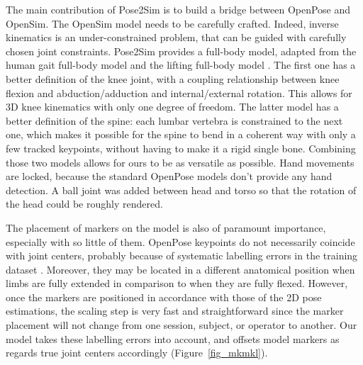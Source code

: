 The main contribution of Pose2Sim is to build a bridge between OpenPose and OpenSim. The OpenSim model needs to be carefully crafted. Indeed, inverse kinematics is an under-constrained problem, that can be guided with carefully chosen joint constraints. Pose2Sim provides a full-body model, adapted from the human gait full-body model \cite{Rajagopal2016} and the lifting full-body model \cite{Beaucage-Gauvreau2019}. The first one has a better definition of the knee joint, with a coupling relationship between knee flexion and abduction/adduction and internal/external rotation. This allows for 3D knee kinematics with only one degree of freedom. The latter model has a better definition of the spine: each lumbar vertebra is constrained to the next one, which makes it possible for the spine to bend in a coherent way with only a few tracked keypoints, without having to make it a rigid single bone. Combining those two models allows for ours to be as versatile as possible. Hand movements are locked, because the standard OpenPose models don't provide any hand detection. A ball joint was added between head and torso so that the rotation of the head could be roughly rendered. 

The placement of markers on the model is also of paramount importance, especially with so little of them. OpenPose keypoints do not necessarily coincide with joint centers, probably because of systematic labelling errors in the training dataset \cite{Needham2021b}. Moreover, they may be located in a different anatomical position when limbs are fully extended in comparison to when they are fully flexed. However, once the markers are positioned in accordance with those of the 2D pose estimations, the scaling step is very fast and straightforward since the marker placement will not change from one session, subject, or operator to another. Our model takes these labelling errors into account, and offsets model markers as regards true joint centers accordingly (Figure~\ref{fig_mkmkl}).

\clearpage

